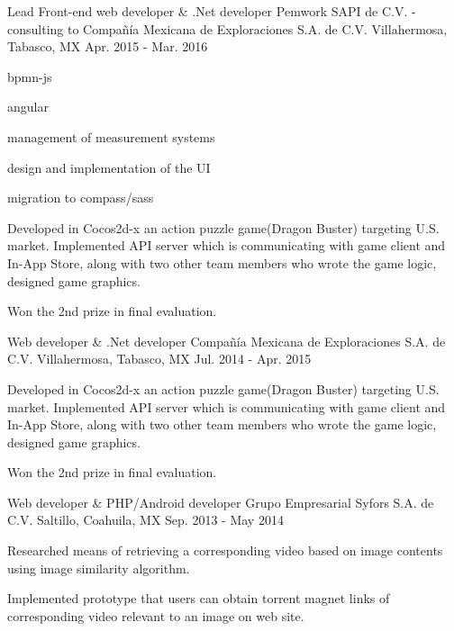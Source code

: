 \begin{cventries}
\cventry
{Lead Front-end web developer \& .Net developer} %
{Pemwork SAPI de C.V. - consulting to Compañía Mexicana de Exploraciones S.A. de C.V.} %
{Villahermosa, Tabasco, MX} %
{Apr. 2015 - Mar. 2016} %
{ %
\begin{cvitems}
	\item{bpmn-js}
	\item{angular}
	\item{management of measurement systems}
	\item{design and implementation of the UI}
	\item{migration to compass/sass}
\item {Developed in Cocos2d-x an action puzzle game(Dragon Buster) targeting U.S. market. Implemented API server which is communicating with game client and In-App Store, along with two other team members who wrote the game logic, designed game graphics.}
\item {Won the 2nd prize in final evaluation.}
\end{cvitems}
}


\cventry
{Web developer \& .Net developer} %
{Compañía Mexicana de Exploraciones S.A. de C.V.} %
{Villahermosa, Tabasco, MX} %
{Jul. 2014 - Apr. 2015} %
{ %
	\begin{cvitems}
		\item {Developed in Cocos2d-x an action puzzle game(Dragon Buster) targeting U.S. market. Implemented API server which is communicating with game client and In-App Store, along with two other team members who wrote the game logic, designed game graphics.}
		\item {Won the 2nd prize in final evaluation.}
	\end{cvitems}
}


\cventry
{Web developer \& PHP/Android developer} %
{Grupo Empresarial Syfors S.A. de C.V.} %
{Saltillo, Coahuila, MX} %
{Sep. 2013 - May 2014} %
{ %
	\begin{cvitems}
	\item {Researched means of retrieving a corresponding video based on image contents using image similarity algorithm.}
	\item {Implemented prototype that users can obtain torrent magnet links of corresponding video relevant to an image on web site.}
	\end{cvitems} 
}


\end{cventries}
